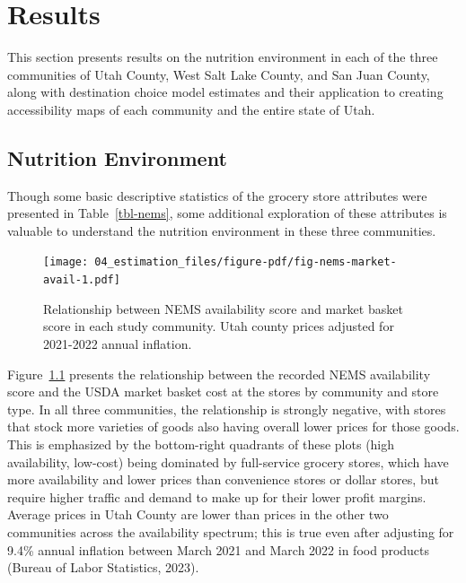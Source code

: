 \documentclass[
  letterpaper,
  DIV=11,
  numbers=noendperiod]{scrreport}
\begin{document}

\hypertarget{sec-results}{%
\chapter{Results}\label{sec-results}}

This section presents results on the nutrition environment in each of
the three communities of Utah County, West Salt Lake County, and San
Juan County, along with destination choice model estimates and their
application to creating accessibility maps of each community and the
entire state of Utah.

\hypertarget{sec-nems}{%
\section{Nutrition Environment}\label{sec-nems}}

Though some basic descriptive statistics of the grocery store attributes
were presented in Table~\ref{tbl-nems}, some additional exploration of
these attributes is valuable to understand the nutrition environment in
these three communities.

\begin{figure}[t]

{\centering \texttt{[image: 04\_estimation\_files/figure-pdf/fig-nems-market-avail-1.pdf]}

}

\caption{\label{fig-nems-market-avail}Relationship between NEMS
availability score and market basket score in each study community. Utah
county prices adjusted for 2021-2022 annual inflation.}

\end{figure}

Figure~\ref{fig-nems-market-avail} presents the relationship between the
recorded NEMS availability score and the USDA market basket cost at the
stores by community and store type. In all three communities, the
relationship is strongly negative, with stores that stock more varieties
of goods also having overall lower prices for those goods. This is
emphasized by the bottom-right quadrants of these plots (high
availability, low-cost) being dominated by full-service grocery stores,
which have more availability and lower prices than convenience stores or
dollar stores, but require higher traffic and demand to make up for
their lower profit margins. Average prices in Utah County are lower than
prices in the other two communities across the availability spectrum;
this is true even after adjusting for 9.4\% annual inflation between
March 2021 and March 2022 in food products (Bureau of Labor Statistics,
2023).
\end{document}
